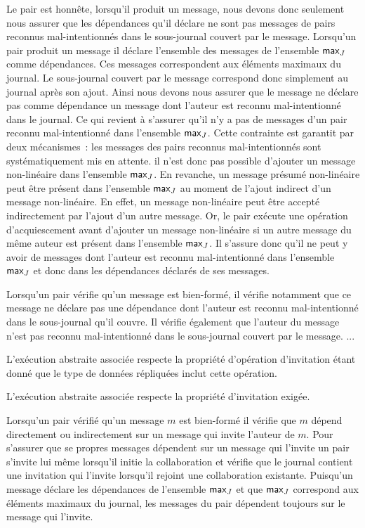 Le pair est honnête, lorsqu'il produit un message, nous devons donc seulement nous assurer que les dépendances qu'il déclare ne sont pas messages de pairs reconnus mal-intentionnés dans le sous-journal couvert par le message.
Lorsqu'un pair produit un message il déclare l'ensemble des messages de l'ensemble $\operatorname{\mathsf{max}}_J$ comme dépendances.
Ces messages correspondent aux éléments maximaux du journal.
Le sous-journal couvert par le message correspond donc simplement au journal après son ajout.
Ainsi nous devons nous assurer que le message ne déclare pas comme dépendance un message dont l'auteur est reconnu mal-intentionné dans le journal.
Ce qui revient à s'assurer qu'il n'y a pas de messages d'un pair reconnu mal-intentionné dans l'ensemble $\operatorname{\mathsf{max}}_J$.
Cette contrainte est garantit par deux mécanismes~: les messages des pairs reconnus mal-intentionnés sont systématiquement mis en attente.
il n'est donc pas possible d'ajouter un message non-linéaire dans l'ensemble $\operatorname{\mathsf{max}}_J$.
En revanche, un message présumé non-linéaire peut être présent dans l'ensemble $\operatorname{\mathsf{max}}_J$ au moment de l'ajout indirect d'un message non-linéaire.
En effet, un message non-linéaire peut être accepté indirectement par l'ajout d'un autre message.
Or, le pair exécute une opération d'acquiescement avant d'ajouter un message non-linéaire si un autre message du même auteur est présent dans l'ensemble $\operatorname{\mathsf{max}}_J$.
Il s'assure donc qu'il ne peut y avoir de messages dont l'auteur est reconnu mal-intentionné dans l'ensemble $\operatorname{\mathsf{max}}_J$ et donc dans les dépendances déclarés de ses messages.

Lorsqu'un pair vérifie qu'un message est bien-formé, il vérifie notamment que ce message ne déclare pas une dépendance dont l'auteur est reconnu mal-intentionné dans le sous-journal qu'il couvre.
Il vérifie également que l'auteur du message n'est pas reconnu mal-intentionné dans le sous-journal couvert par le message.
...

L'exécution abstraite associée respecte la propriété d'opération d'invitation étant donné que le type de données répliquées inclut cette opération.

L'exécution abstraite associée respecte la propriété d'invitation exigée.

Lorsqu'un pair vérifié qu'un message $m$ est bien-formé il vérifie que $m$ dépend directement ou indirectement sur un message qui invite l'auteur de $m$.
Pour s'assurer que se propres messages dépendent sur un message qui l'invite un pair s'invite lui même lorsqu'il initie la collaboration et vérifie que le journal contient une invitation qui l'invite lorsqu'il rejoint une collaboration existante.
Puisqu'un message déclare les dépendances de l'ensemble $\operatorname{\mathsf{max}}_J$ et que $\operatorname{\mathsf{max}}_J$ correspond aux éléments maximaux du journal, les messages du pair dépendent toujours sur le message qui l'invite.

